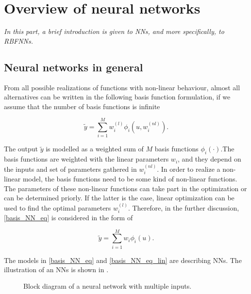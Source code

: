 
\chapter{Overview of neural networks}
\label{neural_networks}

\emph{In this part, a brief introduction is given to NNs, and more specifically, to RBFNNs. }

\section{Neural networks in general}
\label{neural_network_general}

From all possible realizations of functions with non-linear behaviour, almost all alternatives can be written in the following basis function formulation, if we assume that the number of basis functions is infinite \cite{norgaard2003neural}

\begin{equation}
\label{basis_NN_eq}
\tilde{y} = \sum_{i = 1}^M w^{(l)}_i \phi_i(u, w^{(nl)}_i).
\end{equation}

The output $\tilde{y}$ is modelled as a weighted sum of $M$ basis functions $\phi_i(\cdot)$.The basis functions are weighted with the linear parameters $w_i$, and they depend on the inputs and set of parameters gathered in $w^{(nl)}_i$. In order to realize a non-linear model, the basis functions need to be some kind of non-linear functions. The parameters of these non-linear functions can take part in the optimization or can be determined priorly. If the latter is the case, linear optimization can be used to find the optimal parameters $w^{(l)}_i$. Therefore, in the further discussion, \eqref{basis_NN_eq} is considered in the form of

 \begin{equation}
\label{basis_NN_eq_lin}
\tilde{y} = \sum_{i = 1}^M w_i \phi_i(u).
\end{equation}

The models in \eqref{basis_NN_eq} and \eqref{basis_NN_eq_lin} are describing NNs. The illustration of an NNs is shown in .

\vspace{-5mm}

\begin{figure}[H]
\centering
 
\caption{Block diagram of a neural network with multiple inputs.}
\label{fig:nn_example_block}
\end{figure}

